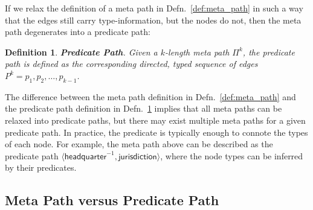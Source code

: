 \documentclass[reprint,twocolumn,showpacs,preprintnumbers,amsmath, aps,pre,amssymb]{revtex4-1}
\newtheorem{definition}{Definition}
\newcommand{\ignore}[1]{}
\begin{document}
\ignore{
\IncMargin{1em}
\begin{algorithm}
\SetAlgoLined
\SetKwData{P}{$\mathbf{P}$} %
\SetKwData{T}{$\mathbf{T}^{\LCdot}$} %
\SetKwData{K}{$k$} %
\SetKwData{NodePair}{$(u,v)$} %
\SetKwFunction{FindMetaPath}{extractMetaPath}
\SetKwFunction{PathExtraction}{$pathExtraction$}
\SetKwFunction{Union}{union}

\SetKwInOut{Input}{input}\SetKwInOut{Output}{output}
\Input{node pair set \T, length constraint \K}
\Output{meta path set \P}

\BlankLine

\P = \{\}\;

\ForEach{\NodePair $\in$ \T }{
    \tcp{extract all path between $u$ and $v$}
    \P.\Union{\FindMetaPath{$u$,$v$,\K}}\;
}

 \caption{\protect\PathExtraction{\protect\T,\protect\K}}
 \label{algo:find_path}

\end{algorithm}
\DecMargin{1em}
}

If we relax the definition of a meta path in Defn.~\ref{def:meta_path} in such a way that the edges still carry type-information, but the nodes do not, then the meta path degenerates into a predicate path:


\begin{definition} \label{def:predicate_path}
\textbf{Predicate Path}. Given a $k$-length meta path $\Pi^{k}$, the predicate path is defined as the corresponding directed, typed sequence of edges $P^{k} = {p_1, p_2, \ldots, p_{k-1}}$.
\end{definition}

The difference between the meta path definition in Defn.~\ref{def:meta_path} and the predicate path definition in Defn.~\ref{def:predicate_path} implies that all meta paths can be relaxed into predicate paths, but there may exist multiple meta paths for a given predicate path. In practice, the predicate is typically enough to connote the types of each node. For example, the meta path above can be described as the predicate path $\langle\textsf{headquarter}^{-1}, \textsf{jurisdiction}\rangle$, where the node types can be inferred by their predicates.

\subsection{Meta Path versus Predicate Path} \label{sec:metapath_predicatepath}
\end{document}
